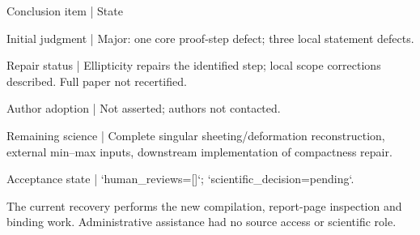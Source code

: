 \documentclass[10pt]{article}
\begin{document}
Conclusion item | State\par
Initial judgment | Major: one core proof-step defect; three local statement defects.\par
Repair status | Ellipticity repairs the identified step; local scope corrections described. Full paper not recertified.\par
Author adoption | Not asserted; authors not contacted.\par
Remaining science | Complete singular sheeting/deformation reconstruction, external min–max inputs, downstream implementation of compactness repair.\par
Acceptance state | `human\_reviews=[]`; `scientific\_decision=pending`.\par
The current recovery performs the new compilation, report-page inspection and binding work. Administrative assistance had no source access or scientific role.\par
\end{document}

